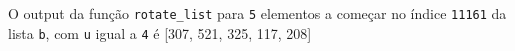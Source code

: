 \documentclass[12pt,varwidth=16cm,border=1pt]{standalone}
\begin{document}
O output da função \verb+rotate_list+ para \verb+5+ elementos a começar no índice \verb+11161+ da lista \verb+b+, com \verb+u+ igual a \verb+4+ é [307, 521, 325, 117, 208] 

\questiomtrue
\end{document}
